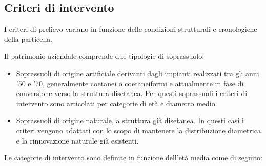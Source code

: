 \subsection{Criteri di intervento}

I criteri di prelievo variano in funzione delle condizioni strutturali e
cronologiche della particella.

Il patrimonio aziendale comprende due tipologie di soprassuolo:

\begin{itemize}

\item Soprassuoli di origine artificiale derivanti dagli impianti realizzati tra
gli anni '50 e '70, generalmente coetanei o coetaneiformi e attualmente in fase
di conversione verso la struttura disetanea. Per questi soprassuoli i criteri di
intervento sono articolati per categorie di età e diametro medio.

\item Soprassuoli di origine naturale, a struttura già disetanea. In questi casi
i criteri vengono adattati con lo scopo di mantenere la distribuzione diametrica
e la rinnovazione naturale già esistenti.

\end{itemize}

Le categorie di intervento sono definite in funzione dell'età media come di seguito:

